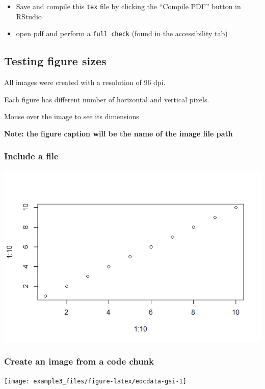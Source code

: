 \documentclass[
]{article}
\providecommand{\tightlist}{%
  \setlength{\itemsep}{0pt}\setlength{\parskip}{0pt}}
\begin{document}
\begin{itemize}
\tightlist
\item
  Save and compile this \texttt{tex} file by clicking the ``Compile
  PDF'' button in RStudio
\item
  open pdf and perform a \texttt{full\ check} (found in the
  accessibility tab)
\end{itemize}

\subsection{Testing figure sizes}\label{testing-figure-sizes}

All images were created with a resolution of 96 dpi.

Each figure has different number of horizontal and vertical pixels.

Mouse over the image to see its dimensions

\textbf{Note: the figure caption will be the name of the image file
path}

\subsubsection{Include a file}\label{include-a-file}

\includegraphics[width=600px]{figures/test6}

\subsubsection{Create an image from a code
chunk}\label{create-an-image-from-a-code-chunk}

\texttt{[image: example3\_files/figure-latex/eocdata-gsi-1]}
\end{document}
